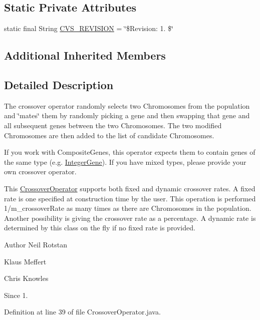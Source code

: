 \subsection*{Static Private Attributes}
\begin{DoxyCompactItemize}
\item 
static final String \hyperlink{classorg_1_1jgap_1_1impl_1_1_crossover_operator_aa73ddc68b26dbdc664092f82f5e2b25b}{C\-V\-S\-\_\-\-R\-E\-V\-I\-S\-I\-O\-N} = \char`\"{}\$Revision\-: 1. \$\char`\"{}
\end{DoxyCompactItemize}
\subsection*{Additional Inherited Members}


\subsection{Detailed Description}
The crossover operator randomly selects two Chromosomes from the population and \char`\"{}mates\char`\"{} them by randomly picking a gene and then swapping that gene and all subsequent genes between the two Chromosomes. The two modified Chromosomes are then added to the list of candidate Chromosomes.

If you work with Composite\-Genes, this operator expects them to contain genes of the same type (e.\-g. \hyperlink{classorg_1_1jgap_1_1impl_1_1_integer_gene}{Integer\-Gene}). If you have mixed types, please provide your own crossover operator.

This \hyperlink{classorg_1_1jgap_1_1impl_1_1_crossover_operator}{Crossover\-Operator} supports both fixed and dynamic crossover rates. A fixed rate is one specified at construction time by the user. This operation is performed 1/m\-\_\-crossover\-Rate as many times as there are Chromosomes in the population. Another possibility is giving the crossover rate as a percentage. A dynamic rate is determined by this class on the fly if no fixed rate is provided.

\begin{DoxyAuthor}{Author}
Neil Rotstan 

Klaus Meffert 

Chris Knowles 
\end{DoxyAuthor}
\begin{DoxySince}{Since}
1. 
\end{DoxySince}


Definition at line 39 of file Crossover\-Operator.\-java.



